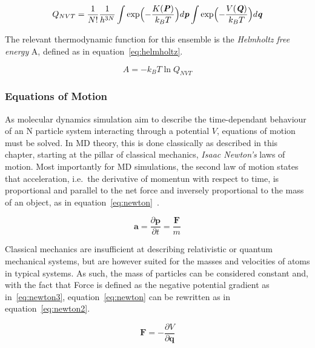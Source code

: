\documentclass[12pt]{article}
\begin{document}
\begin{equation}
  Q_{NVT} = \frac{1}{N!}\frac{1}{h^{3N}}\int \exp\Bigl(-\frac{K(\textbf{\textit{P}})}{k_BT}\Bigl)d\textbf{\textit{p}}\int \exp\Bigl(-\frac{V(\textbf{\textit{Q}})}{k_BT}\Bigl)d\textbf{\textit{q}}
  \label{eq:partition2}
\end{equation}

\bigskip

\noindent The relevant thermodynamic function for this ensemble is the \textit{Helmholtz free energy} A, defined as in equation~\ref{eq:helmholtz}.

\begin{equation}
  A=-k_BT \ln Q_{NVT}
  \label{eq:helmholtz}
\end{equation}

\bigskip

\subsubsection{Equations of Motion}
As molecular dynamics simulation aim to describe the time-dependant behaviour of an N particle system interacting through a potential $V$, equations of motion must be solved. In MD theory, this is done classically as described in this chapter, starting at the pillar of classical mechanics, \textit{Isaac Newton's} laws of motion. Most importantly for MD simulations, the second law of motion states that acceleration, i.e.~the derivative of momentun with respect to time, is proportional and parallel to the net force and inversely proportional to the mass of an object, as in equation~\ref{eq:newton}~\cite{Alrasheed2019}.

\begin{equation}
  \textbf{a} = \frac{\partial\textbf{p}}{\partial t} = \frac{\textbf{F}}{m}
  \label{eq:newton}
\end{equation}

\bigskip

\noindent Classical mechanics are insufficient at describing relativistic or quantum mechanical systems, but are however suited for the masses and velocities of atoms in typical systems.  As such, the mass of particles can be considered constant and, with the fact that Force is defined as the negative potential gradient as in~\ref{eq:newton3}, equation~\ref{eq:newton} can be rewritten as in equation~\ref{eq:newton2}.

\begin{equation}
  \textbf{F} = -\frac{\partial V}{\partial\textbf{q}}
  \label{eq:newton3}
\end{equation}
\end{document}

